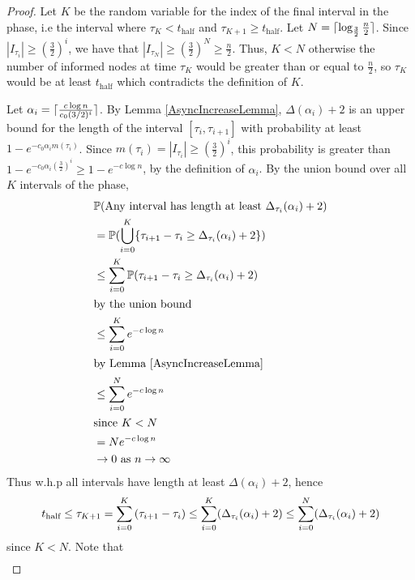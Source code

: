 \begin{proof}
	Let $K$ be the random variable for the index of the final interval in the phase, i.e the interval where $\tau_K < t_\text{half}$ and $\tau_{K+1} \geq t_\text{half}$.
	Let $N = \lceil\log_\frac{3}{2}\frac{n}{2}\rceil$.  Since $|I_{\tau_i}| \geq (\frac{3}{2})^i$, we have that $|I_{\tau_N}| \geq (\frac{3}{2})^N \geq \frac{n}{2}$. Thus, $K < N$ otherwise the number of informed nodes at time $\tau_K$ would be greater than or equal to $\frac{n}{2}$, so $\tau_K$ would be at least $t_\text{half}$ which contradicts the definition of $K$.

	Let $\alpha_i = \lceil\frac{c \log n}{c_0 (3/2)^i}\rceil$. %
	By Lemma \ref{AsyncIncreaseLemma}, $\Delta(\alpha_i) + 2$ is an upper bound for the length of the interval $[\tau_i, \tau_{i+1}]$ 
	with probability at least $1 - e^{-c_0\alpha_i m(\tau_i)}$. %
	Since $m(\tau_i) = |I_{\tau_i}| \geq (\frac{3}{2})^i$, this probability is greater than $1 - e^{-c_0\alpha_i (\frac{3}{2})^i} \geq 1 - e^{-c \log n}$, by the definition of $\alpha_i$. By the union bound over all $K$ intervals of the phase,
	\begin{align*}
		& \mathbb{P}(\text{Any interval has length at least } \Delta_{\tau_i}(\alpha_i) + 2) \\
		&= \mathbb{P}(\bigcup_{i=0}^K \{\tau_{i+1} - \tau_i \geq \Delta_{\tau_i}(\alpha_i) + 2\}) \\
		&\leq \sum_{i=0}^K \mathbb{P}(\tau_{i+1} - \tau_i \geq \Delta_{\tau_i}(\alpha_i) + 2) \\
		\intertext{by the union bound}
		&\leq \sum_{i=0}^K e^{-c \log n} \\
		\intertext{by Lemma \ref{AsyncIncreaseLemma}}	
		&\leq \sum_{i=0}^N e^{-c \log n} \\
		\intertext{since $K < N$}
		&= N e^{-c \log n} \\ %
		&\to 0 \text { as } n \to \infty
	\end{align*}
	Thus w.h.p all intervals have length at least $\Delta(\alpha_i) + 2$, hence
	\begin{equation}\label{eq:t_halfBound}
		t_\text{half} 
		\leq \tau_{K+1} 
		= \sum_{i=0}^K \left( \tau_{i+1} - \tau_i  \right) 
		\leq \sum_{i=0}^K (\Delta_{\tau_i}(\alpha_i) + 2) 
		\leq \sum_{i=0}^N (\Delta_{\tau_i}(\alpha_i) + 2) 
	\end{equation}
	since $K < N$.
	Note that 
	\begin{align*}

\end{align*}
\end{proof}

